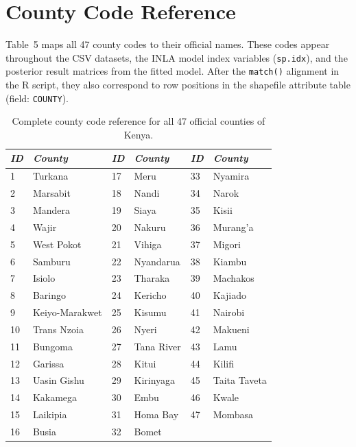 \documentclass[11pt,a4paper]{article}
\newcommand{\code}[1]{\texttt{\small #1}}
\begin{document}
\section{County Code Reference}

Table~5 maps all 47 county codes to their official names. These codes appear
throughout the CSV datasets, the INLA model index variables (\code{sp.idx}),
and the posterior result matrices from the fitted model. After the
\code{match()} alignment in the R script, they also correspond to row positions
in the shapefile attribute table (field: \code{COUNTY}).

\begin{table}[H]
\caption{Complete county code reference for all 47 official counties of Kenya.}
\renewcommand{\arraystretch}{1.10}
\scriptsize\begin{tabularx}{\textwidth}{@{}
  C{0.9cm}L{3.9cm}
  C{0.9cm}L{3.9cm}
  C{0.9cm}L{3.7cm}@{}}
\toprule
\textit{ID} & \textit{County} &
\textit{ID} & \textit{County} &
\textit{ID} & \textit{County}\\
  & Turkana        & 17 & Meru        & 33 & Nyamira\\
2  & Marsabit       & 18 & Nandi       & 34 & Narok\\
3  & Mandera        & 19 & Siaya       & 35 & Kisii\\
4  & Wajir          & 20 & Nakuru      & 36 & Murang'a\\
5  & West Pokot     & 21 & Vihiga      & 37 & Migori\\
6  & Samburu        & 22 & Nyandarua   & 38 & Kiambu\\
7  & Isiolo         & 23 & Tharaka     & 39 & Machakos\\
8  & Baringo        & 24 & Kericho     & 40 & Kajiado\\
9  & Keiyo-Marakwet & 25 & Kisumu      & 41 & Nairobi\\
10 & Trans Nzoia    & 26 & Nyeri       & 42 & Makueni\\
11 & Bungoma        & 27 & Tana River  & 43 & Lamu\\
12 & Garissa        & 28 & Kitui       & 44 & Kilifi\\
13 & Uasin Gishu    & 29 & Kirinyaga   & 45 & Taita Taveta\\
14 & Kakamega       & 30 & Embu        & 46 & Kwale\\
15 & Laikipia       & 31 & Homa Bay    & 47 & Mombasa\\
16 & Busia          & 32 & Bomet       &         &\\
\bottomrule
\end{tabularx}
\renewcommand{\arraystretch}{1.10}
\end{table}
\end{document}

